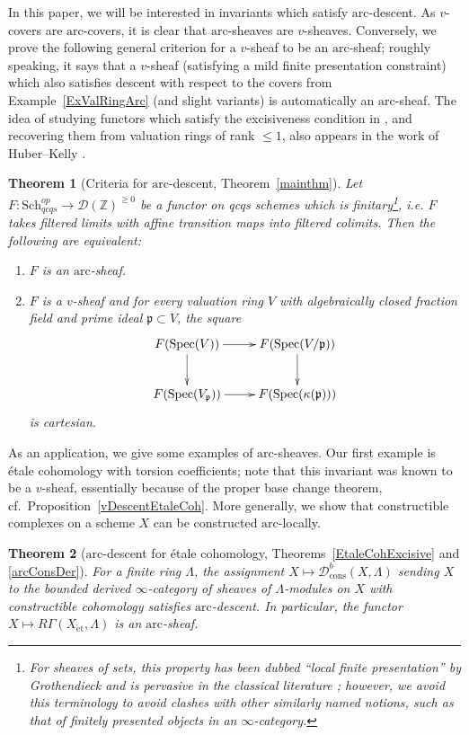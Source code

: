 \documentclass[reqno]{amsart}
\newcommand{\spec}{\mathrm{Spec}}
\newcommand{\et}{\mathrm{\acute{e}t}}
\newcommand{\arc}{\mathrm{arc}}
\newcommand{\D}{\mathcal{D}}
\newtheorem{theorem}{Theorem}[section]
\theoremstyle{definition}
\begin{document}
In this paper, we will be interested in invariants which satisfy $\arc$-descent. As $v$-covers are $\arc$-covers, it is clear that $\arc$-sheaves are $v$-sheaves. Conversely, we prove the following general criterion for a $v$-sheaf to be an $\arc$-sheaf; roughly speaking, it says that a $v$-sheaf (satisfying a mild finite presentation constraint) which also satisfies descent with respect to the covers from Example~\ref{ExValRingArc} (and slight variants) is automatically an $\arc$-sheaf. 
The idea of studying functors which satisfy the excisiveness condition in
, and recovering them from valuation rings of rank $\leq 1$,
also appears in the work of Huber--Kelly \cite{HK18}. 

\begin{theorem}[Criteria for $\arc$-descent, Theorem~\ref{mainthm}] 
Let $F\colon  \mathrm{Sch}_{qcqs}^{op} \to \D(\mathbb{Z})^{\geq 0}$ be a functor on qcqs
schemes which is finitary\footnote{For sheaves of sets, this property has been dubbed ``local finite presentation''  by Grothendieck and is pervasive in the classical literature \cite[Tag 049J]{stacks-project}; however, we avoid this terminology to avoid clashes with other similarly named notions, such as that of finitely presented objects in an $\infty$-category.}, i.e. $F$ takes filtered limits with affine transition maps into filtered
colimits. Then the following are equivalent: 
\begin{enumerate}
\item $F$ is an $\arc$-sheaf.  
\item $F$ is a $v$-sheaf and for every valuation
ring $V$ with algebraically closed fraction field and prime ideal $\mathfrak{p} \subset V$, the square
\[ \xymatrix{ F( \spec(V)) \ar[d] \ar[r] &  F( \spec( V/\mathfrak{p})) \ar[d]
\\
F( \spec( V_{\mathfrak{p}})) \ar[r] &  F( \spec(\kappa( \mathfrak{p})))
}\]
is cartesian. 
\end{enumerate}
\end{theorem} 

As an application, we give some examples of $\arc$-sheaves. Our first example
is \'etale cohomology with torsion coefficients; note that this invariant was
known to be a $v$-sheaf, essentially because of the proper base change theorem,
cf.~Proposition~\ref{vDescentEtaleCoh}. More generally, we show that constructible complexes on a scheme $X$ can be constructed $\arc$-locally.



\begin{theorem}[$\arc$-descent for \'etale cohomology,
Theorems~\ref{EtaleCohExcisive} and \ref{arcConsDer}] 
\label{v1descent}
For a finite ring $\Lambda$, the assignment $X \mapsto
\D^b_{\mathrm{cons}}(X, \Lambda)$ sending $X$ to the bounded derived
$\infty$-category of sheaves of $\Lambda$-modules on $X$ with constructible
cohomology satisfies $\arc$-descent.  In particular, the functor $X \mapsto R \Gamma(X_{\et}, \Lambda)$ is an $\arc$-sheaf.
\end{theorem} 
\end{document}
